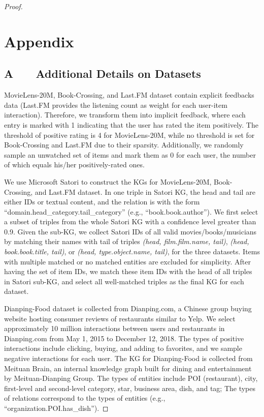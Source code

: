 \documentclass[sigconf]{acmart}
\begin{document}
\begin{proof}

 


\newpage
\section*{Appendix}
	\subsection*{A \ \ \ Additional Details on Datasets}
		MovieLens-20M, Book-Crossing, and Last.FM dataset contain explicit feedbacks data (Last.FM provides the listening count as weight for each user-item interaction).
		Therefore, we transform them into implicit feedback, where each entry is marked with 1 indicating that the user has rated the item positively.
		The threshold of positive rating is 4 for MovieLens-20M, while no threshold is set for Book-Crossing and Last.FM due to their sparsity.
		Additionally, we randomly sample an unwatched set of items and mark them as 0 for each user, the number of which equals his/her positively-rated ones.
		
		We use Microsoft Satori to construct the KGs for MovieLens-20M, Book-Crossing, and Last.FM dataset.
		In one triple in Satori KG, the head and tail are either IDs or textual content, and the relation is with the form ``domain.head\_category.tail\_category'' (e.g., ``book.book.author'').
		We first select a subset of triples from the whole Satori KG with a confidence level greater than 0.9.
		Given the sub-KG, we collect Satori IDs of all valid movies/books/musicians by matching their names with tail of triples \textit{(head, film.film.name, tail)}, \textit{(head, book.book.title, tail)}, or \textit{(head, type.object.name, tail)}, for the three datasets.
		Items with multiple matched or no matched entities are excluded for simplicity.
		After having the set of item IDs, we match these item IDs with the head of all triples in Satori sub-KG, and select all well-matched triples as the final KG for each dataset.
		
		Dianping-Food dataset is collected from Dianping.com, a Chinese group buying website hosting consumer reviews of restaurants similar to Yelp.
		We select approximately 10 million interactions between users and restaurants in Dianping.com from May 1, 2015 to December 12, 2018.
		The types of positive interactions include clicking, buying, and adding to favorites, and we sample negative interactions for each user.
		The KG for Dianping-Food is collected from Meituan Brain, an internal knowledge graph built for dining and entertainment by Meituan-Dianping Group.
		The types of entities include POI (restaurant), city, first-level and second-level category, star, business area, dish, and tag;
		The types of relations correspond to the types of entities (e.g., ``organization.POI.has\_dish'').
		


\end{proof}
\end{document}
